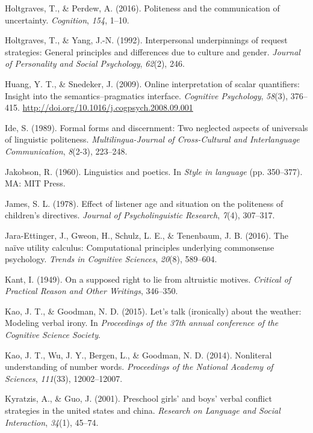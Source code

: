 \documentclass[oneside]{report}
\begin{document}
\hypertarget{ref-holtgraves2016}{}
Holtgraves, T., \& Perdew, A. (2016). Politeness and the communication
of uncertainty. \emph{Cognition}, \emph{154}, 1--10.

\hypertarget{ref-holtgraves1992}{}
Holtgraves, T., \& Yang, J.-N. (1992). Interpersonal underpinnings of
request strategies: General principles and differences due to culture
and gender. \emph{Journal of Personality and Social Psychology},
\emph{62}(2), 246.

\hypertarget{ref-huang2009a}{}
Huang, Y. T., \& Snedeker, J. (2009). Online interpretation of scalar
quantifiers: Insight into the semantics--pragmatics interface.
\emph{Cognitive Psychology}, \emph{58}(3), 376--415.
\url{http://doi.org/10.1016/j.cogpsych.2008.09.001}

\hypertarget{ref-ide1989}{}
Ide, S. (1989). Formal forms and discernment: Two neglected aspects of
universals of linguistic politeness. \emph{Multilingua-Journal of
Cross-Cultural and Interlanguage Communication}, \emph{8}(2-3),
223--248.

\hypertarget{ref-jakobson1960}{}
Jakobson, R. (1960). Linguistics and poetics. In \emph{Style in
language} (pp. 350--377). MA: MIT Press.

\hypertarget{ref-james1978}{}
James, S. L. (1978). Effect of listener age and situation on the
politeness of children's directives. \emph{Journal of Psycholinguistic
Research}, \emph{7}(4), 307--317.

\hypertarget{ref-jara2016naive}{}
Jara-Ettinger, J., Gweon, H., Schulz, L. E., \& Tenenbaum, J. B. (2016).
The naïve utility calculus: Computational principles underlying
commonsense psychology. \emph{Trends in Cognitive Sciences},
\emph{20}(8), 589--604.

\hypertarget{ref-kant1949}{}
Kant, I. (1949). On a supposed right to lie from altruistic motives.
\emph{Critical of Practical Reason and Other Writings}, 346--350.

\hypertarget{ref-kao2015}{}
Kao, J. T., \& Goodman, N. D. (2015). Let's talk (ironically) about the
weather: Modeling verbal irony. In \emph{Proceedings of the 37th annual
conference of the Cognitive Science Society}.

\hypertarget{ref-kao2014}{}
Kao, J. T., Wu, J. Y., Bergen, L., \& Goodman, N. D. (2014). Nonliteral
understanding of number words. \emph{Proceedings of the National Academy
of Sciences}, \emph{111}(33), 12002--12007.

\hypertarget{ref-kyratzis2001}{}
Kyratzis, A., \& Guo, J. (2001). Preschool girls' and boys' verbal
conflict strategies in the united states and china. \emph{Research on
Language and Social Interaction}, \emph{34}(1), 45--74.
\end{document}
